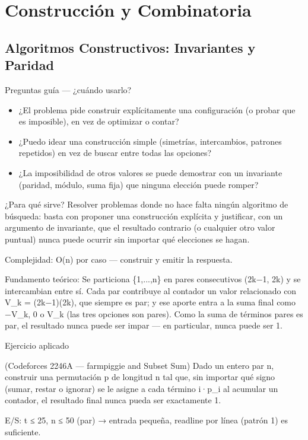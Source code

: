 \section{Construcción y Combinatoria}

\subsection{Algoritmos Constructivos: Invariantes y Paridad}

Preguntas guía — ¿cuándo usarlo?

\begin{itemize}
\item ¿El problema pide construir explícitamente una configuración (o probar que es imposible), en vez de optimizar o contar?
\item ¿Puedo idear una construcción simple (simetrías, intercambios, patrones repetidos) en vez de buscar entre todas las opciones?
\item ¿La imposibilidad de otros valores se puede demostrar con un invariante (paridad, módulo, suma fija) que ninguna elección puede romper?
\end{itemize}

¿Para qué sirve? Resolver problemas donde no hace falta ningún algoritmo de búsqueda: basta con proponer una construcción explícita y justificar, con un argumento de invariante, que el resultado contrario (o cualquier otro valor puntual) nunca puede ocurrir sin importar qué elecciones se hagan.

Complejidad: O(n) por caso — construir y emitir la respuesta.

Fundamento teórico: Se particiona \{1,...,n\} en pares consecutivos (2k−1, 2k) y se intercambian entre sí. Cada par contribuye al contador un valor relacionado con V\_k = (2k−1)(2k), que siempre es par; y ese aporte entra a la suma final como −V\_k, 0 o V\_k (las tres opciones son pares). Como la suma de términos pares es par, el resultado nunca puede ser impar — en particular, nunca puede ser 1.

Ejercicio aplicado

(Codeforces 2246A — farmpiggie and Subset Sum) Dado un entero par n, construir una permutación p de longitud n tal que, sin importar qué signo (sumar, restar o ignorar) se le asigne a cada término i·p\_i al acumular un contador, el resultado final nunca pueda ser exactamente 1.

E/S: t ≤ 25, n ≤ 50 (par) → entrada pequeña, readline por línea (patrón 1) es suficiente.

